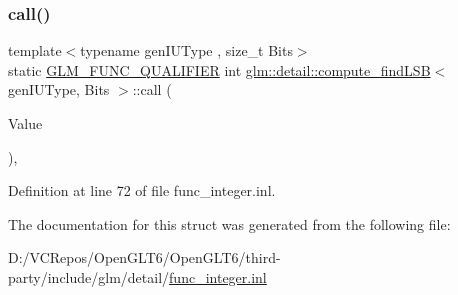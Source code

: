 \subsubsection{\texorpdfstring{call()}{call()}}
{\footnotesize\ttfamily template$<$typename gen\+I\+U\+Type , size\+\_\+t Bits$>$ \\
static \mbox{\hyperlink{setup_8hpp_a33fdea6f91c5f834105f7415e2a64407}{G\+L\+M\+\_\+\+F\+U\+N\+C\+\_\+\+Q\+U\+A\+L\+I\+F\+I\+ER}} int \mbox{\hyperlink{structglm_1_1detail_1_1compute__find_l_s_b}{glm\+::detail\+::compute\+\_\+find\+L\+SB}}$<$ gen\+I\+U\+Type, Bits $>$\+::call (\begin{DoxyParamCaption}\item[{gen\+I\+U\+Type}]{Value }\end{DoxyParamCaption})\hspace{0.3cm}{\ttfamily [inline]}, {\ttfamily [static]}}



Definition at line 72 of file func\+\_\+integer.\+inl.



The documentation for this struct was generated from the following file\+:\begin{DoxyCompactItemize}
\item 
D\+:/\+V\+C\+Repos/\+Open\+G\+L\+T6/\+Open\+G\+L\+T6/third-\/party/include/glm/detail/\mbox{\hyperlink{func__integer_8inl}{func\+\_\+integer.\+inl}}\end{DoxyCompactItemize}
